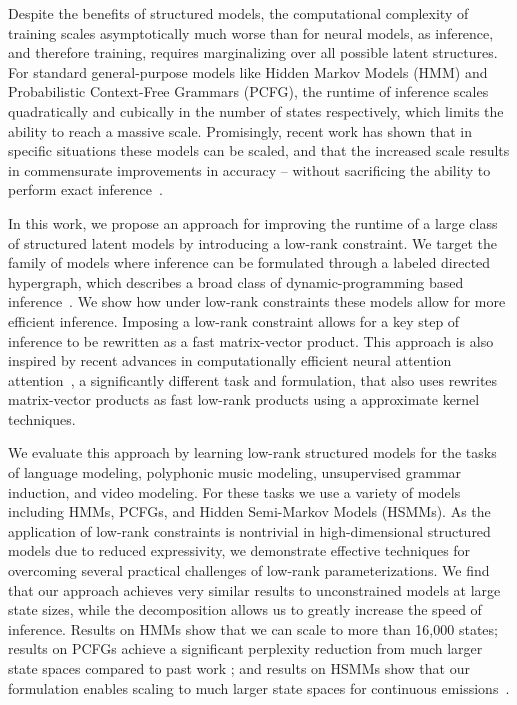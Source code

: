 \documentclass{article}
\begin{document}

Despite the benefits of structured models, the computational complexity of training scales asymptotically much worse than for neural models, as inference, and therefore training, requires marginalizing over all possible latent structures.
For standard general-purpose models like Hidden Markov Models (HMM) and Probabilistic Context-Free Grammars (PCFG), the runtime of inference scales quadratically and cubically in the number of states respectively, which limits the ability to reach a massive scale.
Promisingly, recent work has shown that in specific situations these models can be scaled, and that the increased scale results in commensurate improvements in accuracy -- without sacrificing the ability to perform exact inference~\citep{dedieu2019learning,chiu2020scaling,yang2021pcfgs}.

In this work, we propose an approach for improving the runtime of a large class of structured latent models by introducing a low-rank constraint. 
We target the family of models where inference can be formulated through a
labeled directed hypergraph, which describes a broad class
of dynamic-programming based inference~\citep{klein2004parsing,huang2005better,zhou2006learning,javidian2020hypergraph,chiang2020factor}. We show how under low-rank constraints these models allow for more efficient inference. 
Imposing a low-rank constraint allows for a key step of inference to be rewritten as a fast matrix-vector product.
This approach is also inspired by recent advances in computationally efficient neural attention  attention~\citep{katharopoulos2020lineartransformer,peng2021rfa,choromanski2020performer},
a significantly different task and formulation, that also uses  rewrites matrix-vector products as fast low-rank products using a approximate kernel techniques.

We evaluate this approach by learning low-rank structured models for the tasks of language modeling, polyphonic music modeling, unsupervised grammar induction, and video modeling. For these tasks we use a variety of models including HMMs, PCFGs, and Hidden Semi-Markov Models (HSMMs).
As the application of low-rank constraints is nontrivial in high-dimensional structured models due to reduced expressivity, we demonstrate effective techniques for overcoming several practical challenges of low-rank parameterizations.
We find that our approach achieves very similar results to unconstrained models at large state sizes, while the decomposition allows us to greatly increase the speed of inference.
Results on HMMs show that we can scale to more than 16,000 states; results on PCFGs achieve a significant perplexity reduction from much larger state spaces compared to past work \citep{kim2019cpcfg}; and results on HSMMs show that our formulation enables scaling to much larger state spaces for continuous emissions~\citep{fried2020learning}.
\end{document}
